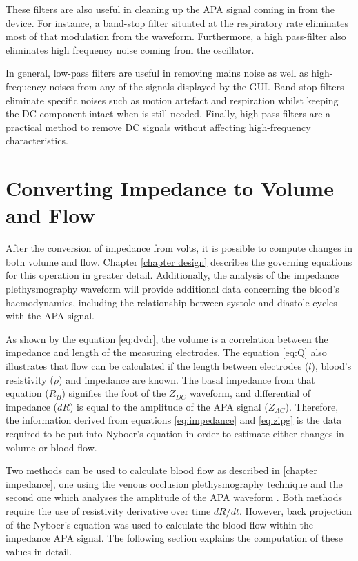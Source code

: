 These filters are also useful in cleaning up the APA signal coming in from the device. For instance, a band-stop filter situated at the respiratory rate eliminates most of that modulation from the waveform. Furthermore, a high pass-filter also eliminates high frequency noise coming from the oscillator.

In general, low-pass filters are useful in removing mains noise as well as high-frequency noises from any of the signals displayed by the GUI. Band-stop filters eliminate specific noises such as motion artefact and respiration whilst keeping the DC component intact when is still needed. Finally, high-pass filters are a practical method to remove DC signals without affecting high-frequency characteristics.

\section{Converting Impedance to Volume and Flow}
\label{section procedure Z to V and Q}

After the conversion of impedance from volts, it is possible to compute changes in both volume and flow. Chapter \ref{chapter design} describes the governing equations for this operation in greater detail. Additionally, the analysis of the impedance plethysmography waveform will provide additional data concerning the blood's haemodynamics, including the relationship between systole and diastole cycles with the APA signal.

As shown by the equation \ref{eq:dvdr}, the volume is a correlation between the impedance and length of the measuring electrodes. The equation \ref{eq:Q} also illustrates that flow can be calculated if the length between electrodes ($l$), blood's resistivity ($\rho$) and impedance are known.  The basal impedance from that equation ($R_B$) signifies the foot of the $Z_{DC}$ waveform, and differential of impedance ($dR$) is equal to the amplitude of the APA signal ($Z_{AC}$). Therefore, the information derived from equations \ref{eq:impedance} and \ref{eq:zipg} is the data required to be put into Nyboer's equation in order to estimate either changes in volume or blood flow.

Two methods can be used to calculate blood flow as described in \ref{chapter impedance}, one using the venous occlusion plethysmography technique \cite{costeloe1980continuous, anderson1984impedance, mohapatra1981non, golden1986assessment} and the second one which analyses the amplitude of the APA waveform \cite{nyboer1974blood,costeloe1980continuous}. Both methods require the use of resistivity derivative over time $dR/dt$. However, back projection of the Nyboer's equation was used to calculate the blood flow within the impedance APA signal. The following section explains the computation of these values in detail.  

